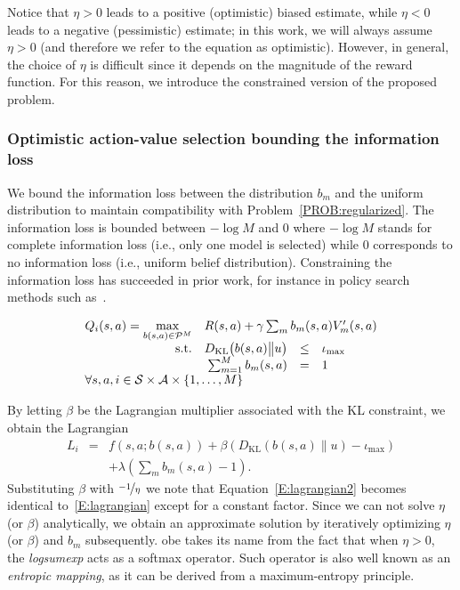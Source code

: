 Notice that $\eta>0$ leads to a positive (optimistic) biased estimate, while $\eta<0$ leads to a negative (pessimistic) estimate; in this work, we will always assume $\eta>0$ (and therefore we refer to the equation as optimistic). 
However, in general, the choice of $\eta$ is difficult since it depends on the magnitude of the reward function. For this reason, we introduce the constrained version of the proposed problem.
 
\subsubsection{Optimistic action-value selection bounding the information loss}
We bound the information loss between the distribution $b_m$ and the uniform distribution to maintain compatibility with Problem~\ref{PROB:regularized}. The information loss is bounded between $-\log M$ and $0$ where  $-\log M$ stands for complete information loss (i.e., only one model is selected) while $0$ corresponds to no information loss (i.e., uniform belief distribution). Constraining the information loss has succeeded in prior work, for instance in policy search methods such as~\cite{peters2010relative}.
\begin{probdef}
\begin{equation}
\begin{array}{rrclcl}
\displaystyle Q_i(s,a) = \max_{b(s,a) \in \mathcal{P}^M} & \multicolumn{3}{l}{R(s,a) + \gamma \sum_m{b}_m(s,a)V_m'(s,a)\nonumber } \\
\text{s.t.} & D_{\mathrm{KL}}\big(b(s,a)\big{\|} u \big)& \leq & \iota_{\max} \\
& \sum_{m=1}^{M} b_m(s,a) & = & 1 \\
\multicolumn{4}{l}{ \forall s,a,i \in \mathcal{S} \times \mathcal{A} \times \{1,\dots,M\}}
\end{array} \nonumber
\end{equation}\label{PROB:constrversion}
\end{probdef}
\noindent By letting $\beta$ be the Lagrangian multiplier associated with the KL constraint, we obtain the Lagrangian
\begin{eqnarray}
L_i &\! = \!& f(s,a;b(s,a)) + \beta (D_{\mathrm{KL}}(b(s,a){\|}u) - \iota_{\max}) \nonumber \\
& &   + \lambda(\sum_m b_m(s,a) - 1).\label{E:lagrangian2}
\end{eqnarray}
Substituting $\beta$ with $\nicefrac{-1}{\eta}$ we note that Equation~\ref{E:lagrangian2} becomes identical to~\ref{E:lagrangian} except for a constant factor. Since we can not solve $\eta$ (or $\beta$) analytically, we obtain an approximate solution by iteratively optimizing $\eta$ (or $\beta$) and $b_m$ subsequently.
\gls{obe} takes its name from the fact that when $\eta > 0$, the \textit{logsumexp} acts as a softmax operator. Such operator is also well known as an \textit{entropic mapping}, as it can be derived from a maximum-entropy principle.

